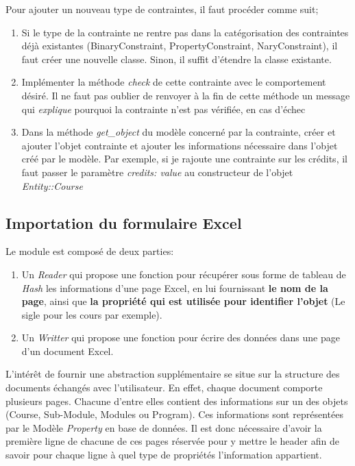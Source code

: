 Pour ajouter un nouveau type de contraintes, il faut procéder comme suit;

\begin{enumerate}
  \item Si le type de la contrainte ne rentre pas dans la catégorisation des contraintes déjà existantes (BinaryConstraint, PropertyConstraint, NaryConstraint), il faut créer une nouvelle classe. Sinon, il suffit d'étendre la classe existante.
  \item Implémenter la méthode \textit{check} de cette contrainte avec le comportement désiré. Il ne faut pas oublier de renvoyer à la fin de cette méthode un message qui \textit{explique} pourquoi la contrainte n'est pas vérifiée, en cas d'échec
  \item Dans la méthode \textit{get\_object} du modèle concerné par la contrainte, créer et ajouter l'objet contrainte et ajouter les informations nécessaire dans l'objet créé par le modèle. Par exemple, si je rajoute une contrainte sur les crédits, il faut passer le paramètre \textit{credits: value} au constructeur de l'objet \textit{Entity::Course}
\end{enumerate}



\subsection{Importation du formulaire Excel}
Le module est composé de deux parties: 
\begin{enumerate}
\item Un \textit{Reader} qui propose une fonction pour récupérer sous forme de tableau de \textit{Hash} les informations d'une page Excel, en lui fournissant \textbf{le nom de la page}, ainsi que \textbf{la propriété qui est utilisée pour identifier l'objet} (Le sigle pour les cours par exemple).
\item Un \textit{Writter} qui propose une fonction pour écrire des données dans une page d'un document Excel.
\end{enumerate}

L'intérêt de fournir une abstraction supplémentaire se situe sur la structure des documents échangés avec l'utilisateur. En effet, chaque document comporte plusieurs pages. Chacune d'entre elles contient des informations sur un des objets (Course, Sub-Module, Modules ou Program). Ces informations sont représentées par le Modèle \textit{Property} en base de données. Il est donc nécessaire d'avoir la première ligne de chacune de ces pages réservée pour y mettre le header afin de savoir pour chaque ligne à quel type de propriétés l'information appartient.

